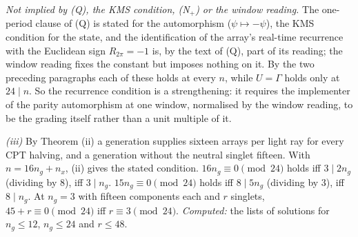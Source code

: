 \emph{Not implied by (Q), the KMS condition, (N$_{+}$) or the window reading.} The one-period clause of (Q) is stated for the automorphism ($\psi \mapsto -\psi$), the KMS condition for the state, and the identification of the array's real-time recurrence with the Euclidean sign $R_{2\pi} = -1$ is, by the text of (Q), part of its reading; the window reading fixes the constant but imposes nothing on it. By the two preceding paragraphs each of these holds at every $n$, while $U = \Gamma$ holds only at $24 \mid n$. So the recurrence condition is a strengthening: it requires the implementer of the parity automorphism at one window, normalised by the window reading, to be the grading itself rather than a unit multiple of it.

\emph{(iii)} By Theorem (ii) a generation supplies sixteen arrays per light ray for every CPT halving, and a generation without the neutral singlet fifteen. With $n = 16n_{g} + n_{x}$, (ii) gives the stated condition. $16n_{g} \equiv 0 \pmod{24}$ holds iff $3 \mid 2n_{g}$ (dividing by $8$), iff $3 \mid n_{g}$. $15n_{g} \equiv 0 \pmod{24}$ holds iff $8 \mid 5n_{g}$ (dividing by $3$), iff $8 \mid n_{g}$. At $n_{g} = 3$ with fifteen components each and $r$ singlets, $45 + r \equiv 0 \pmod{24}$ iff $r \equiv 3 \pmod{24}$. \emph{Computed:} the lists of solutions for $n_{g} \le 12$, $n_{g} \le 24$ and $r \le 48$.

